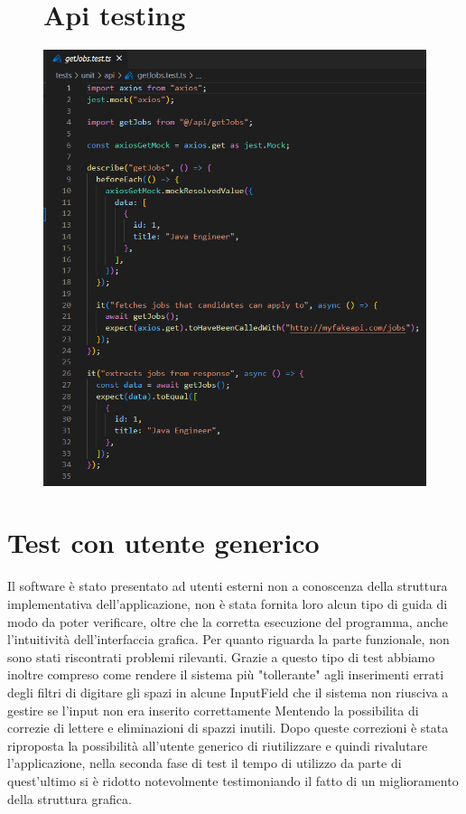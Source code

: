\documentclass[ 4paper,11pt,openany]{book}
\begin{document}
\begin{figure}[htpb!] 
	\section{Api testing}
	\includegraphics{getJobTest.png}
\end{figure}



\section{Test con utente generico}
Il software è stato presentato ad utenti esterni non a conoscenza della struttura implementativa dell'applicazione, non è stata fornita loro alcun tipo di guida di modo da poter verificare, oltre che la corretta esecuzione del programma, anche l'intuitività dell'interfaccia grafica. Per quanto riguarda la parte funzionale, non sono stati riscontrati problemi rilevanti.
Grazie a questo tipo di test abbiamo inoltre compreso come rendere il sistema più "tollerante" agli inserimenti errati degli filtri di digitare gli spazi in alcune InputField che il sistema non riusciva a gestire se l'input non era inserito correttamente Mentendo la possibilita di correzie di lettere e eliminazioni di spazzi inutili. Dopo queste correzioni è stata riproposta la possibilità all'utente generico di riutilizzare e quindi rivalutare l'applicazione, nella seconda fase di test il tempo di utilizzo da parte di quest'ultimo si è ridotto notevolmente testimoniando il fatto di un miglioramento della struttura grafica.
\end{document}
